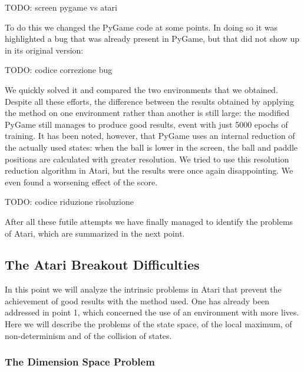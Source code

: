 \smallskip
TODO: screen pygame vs atari
\smallskip

To do this we changed the PyGame code at some points. In doing so it was highlighted a bug that was already present in PyGame, but that did not show up in its original version:

\smallskip
TODO: codice correzione bug
\smallskip

We quickly solved it and compared the two environments that we obtained. Despite all these efforts, the difference between the results obtained by applying the method on one environment rather than another is still large: the modified PyGame still manages to produce good results, event with just 5000 epochs of training. It has been noted, however, that PyGame uses an internal reduction of the actually used states: when the ball is lower in the screen, the ball and paddle positions are calculated with greater resolution. We tried to use this resolution reduction algorithm in Atari, but the results were once again disappointing. We even found a worsening effect of the score.

\smallskip
TODO: codice riduzione risoluzione
\smallskip

After all these futile attempts we have finally managed to identify the problems of Atari, which are summarized in the next point.

\subsection{The Atari Breakout Difficulties}

In this point we will analyze the intrinsic problems in Atari that prevent the achievement of good results with the method used. One has already been addressed in point 1, which concerned the use of an environment with more lives. Here we will describe the problems of the state space, of the local maximum, of non-determinism and of the collision of states.

\subsubsection{The Dimension Space Problem}

